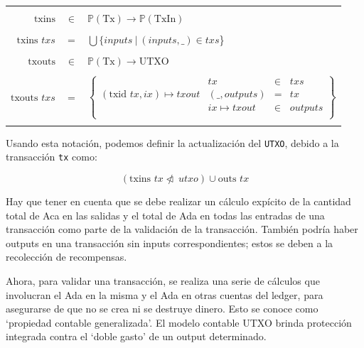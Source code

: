 \documentclass[12pt]{book}
\begin{document}

\begin{center}
    \begin{tabular}{|r c l|}
        \hline &&\\
        $\text{txins}$ & $\in$ & $\mathbb{P}(\text{Tx}) \rightarrow \mathbb{P}(\text{TxIn})$ \\&&\\

        $\text{txins } txs$ & = & $\bigcup \{ inputs\ |\ (inputs, \_ ) \in txs$\} \\&&\\

        $\text{txouts}$ & $\in$ & $\mathbb{P}(\text{Tx}) \rightarrow \text{UTXO}$ \\&&\\

        $\text{txouts } txs$ & = &
            $\left\{
                \begin{array}{l|lcl}
                    & tx & \in & txs \\
                    (\text{txid } tx, ix) \mapsto txout & (\_, outputs) & = & tx \\
                    & ix \mapsto txout & \in & outputs \\
                \end{array}
            \right\} $ \\&&\\
        \hline
    \end{tabular}
\end{center}

Usando esta notación, podemos definir la actualización del \texttt{UTXO}, debido a la transacción \texttt{tx} como:

\[ (\text{txins } tx\ntriangleleft\ utxo) \cup\text{outs } tx \]

Hay que tener en cuenta que se debe realizar un cálculo expícito de la cantidad total de Aca en las salidas y el total de Ada en todas las entradas de una transacción como parte de la validación de la transacción. También podría haber outputs en una transacción sin inputs correspondientes; estos se deben a la recolección de recompensas.

Ahora, para validar una transacción, se realiza una serie de cálculos que involucran el Ada en la misma y el Ada en otras cuentas del ledger, para asegurarse de que no se crea ni se destruye dinero. Esto se conoce como `propiedad contable generalizada'. El modelo contable UTXO brinda protección integrada contra el `doble gasto' de un output determinado.
\end{document}
